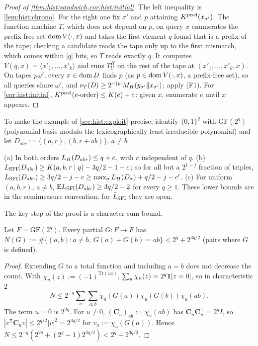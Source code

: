 \begin{proof}[Proof of \cref{thm:hist:sandwich,cor:hist:initial}]
The left inequality is \cref{lem:hist:chrono}. For the right one fix $\sigma'$ and $p$ attaining $K^{\mathrm{pred}}(x_{\sigma'})$. The function machine $T$, which does not depend on $p$, on query $x$ enumerates the prefix-free set $\operatorname{dom} V(\cdot,x)$ and takes the first element $q$ found that is a prefix of the tape; checking a candidate reads the tape only up to the first mismatch, which comes within $|q|$ bits, so $T$ reads exactly $q$. %
It computes $V(q,x)=\langle x'_1,\dots,x'_k\rangle$ and runs $T^H_U$ on the rest of the tape at $(x'_1,\dots,x'_k,x)$. On tapes $p\omega'$, every $x\in\operatorname{dom} D$ finds $p$ (as $p\in\operatorname{dom} V(\cdot,x)$, a prefix-free set), so all queries share $\omega'$, and $\nu_T(D)\ge2^{-|p|}M_{H}(y_{\sigma'}\Vert x_{\sigma'})$; apply (F1). For \cref{cor:hist:initial}, $K^{\mathrm{pred}}(e\text{-order})\le K(e)+c$: given $x$, enumerate $e$ until $x$ appears.
\end{proof}

To make the example of \cref{sec:hist:exploit} precise, identify $\{0,1\}^q$ with $\mathrm{GF}(2^q)$ (polynomial basis modulo the lexicographically least irreducible polynomial) and let $D_{abr}:=\{(a,r),(b,r+ab)\}$, $a\ne b$.

\begin{theorem}\label{thm:hist:gf}
(a) In both orders $L_{H}(D_{abr})\le q+c$, with $c$ independent of $q$. (b) $L_{\mathrm{SFI}}(D_{abr})\ge K(a,b,r\mid q)-3q/2-1-c$; so for all but a $2^{1-j}$ fraction of triples, $L_{\mathrm{SFI}}(D_{abr})\ge3q/2-j-c\ge\max_\sigma L_{H}(D_\sigma)+q/2-j-c'$. (c) For uniform $(a,b,r)$, $a\ne b$, $\mathbb{E}L_{\mathrm{SFI}}(D_{abr})\ge3q/2-2$ for every $q\ge1$. These lower bounds are in the semimeasure convention; for $\bar{L}_{\mathrm{SFI}}$ they are open.
\end{theorem}

The key step of the proof is a character-sum bound.

\begin{lemma}\label{lem:hist:charsum}
Let $F=\mathrm{GF}(2^q)$. Every partial $G:F\to F$ has $N(G):=\#\{(a,b):a\ne b,\ G(a)+G(b)=ab\}<2^q+2^{3q/2}$ (pairs where $G$ is defined).
\end{lemma}

\begin{proof}
Extending $G$ to a total function and including $a=b$ does not decrease the count. With $\chi_u(z):=(-1)^{\mathrm{Tr}(uz)}$, $\sum_u\chi_u(z)=2^q\mathbf{1}[z=0]$, so in characteristic $2$
\[N\le2^{-q}\textstyle\sum_u\sum_{a,b}\chi_u(G(a))\chi_u(G(b))\chi_u(ab).\]
The term $u=0$ is $2^{2q}$. For $u\ne0$, $(\mathbf C_u)_{ab}:=\chi_u(ab)$ has $\mathbf C_u\mathbf C_u^{\mathsf T}=2^qI$, so $|v^{\mathsf T}\mathbf C_uv|\le2^{q/2}|v|^2=2^{3q/2}$ for $v_a:=\chi_u(G(a))$. Hence $N\le2^{-q}(2^{2q}+(2^q-1)2^{3q/2})<2^q+2^{3q/2}$.
\end{proof}


